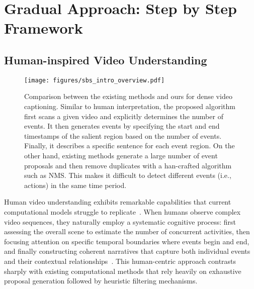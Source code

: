 
\chapter{Gradual Approach: Step by Step Framework}
\label{chap:gradual_pathway}

\section{Human-inspired Video Understanding}
\label{sec:human_inspired}

\begin{sidewaysfigure}
  \centering
  \texttt{[image: figures/sbs\_intro\_overview.pdf]}
  \caption{
    Comparison between the existing methods and ours for dense video captioning.
    Similar to human interpretation, the proposed algorithm first scans a given video and explicitly determines the number of events.
    It then generates events by specifying the start and end timestamps of the salient region based on the number of events.
    Finally, it describes a specific sentence for each event region.
    On the other hand, existing methods generate a large number of event proposals and then remove duplicates with a han-crafted algorithm such as NMS.\@
    This makes it difficult to detect different events (i.e., actions) in the same time period.
  }
  \label{fig:intro_overview}
\end{sidewaysfigure}


Human video understanding exhibits remarkable capabilities that current computational models struggle to replicate~\cite{Heilbron2015-ha,Krishna2017-pw}. When humans observe complex video sequences, they naturally employ a systematic cognitive process: first assessing the overall scene to estimate the number of concurrent activities, then focusing attention on specific temporal boundaries where events begin and end, and finally constructing coherent narratives that capture both individual events and their contextual relationships~\cite{wang2020event,long2021temporal}. This human-centric approach contrasts sharply with existing computational methods that rely heavily on exhaustive proposal generation followed by heuristic filtering mechanisms.

